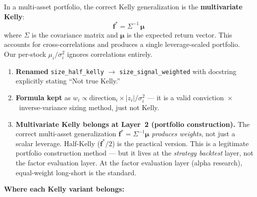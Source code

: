\documentclass[a4paper, 11pt]{report}
\theoremstyle{definition}
\theoremstyle{remark}
\begin{document}
\begin{description}[style=nextline, leftmargin=1.8cm]
        \medskip
        In a multi-asset portfolio, the correct Kelly generalization
        is the \textbf{multivariate Kelly}:
        \[
            \mathbf{f}^* = \Sigma^{-1}\,\boldsymbol{\mu}
        \]
        where $\Sigma$ is the covariance matrix and $\boldsymbol{\mu}$
        is the expected return vector.  This accounts for
        cross-correlations and produces a single leverage-scaled
        portfolio.  Our per-stock $\mu_i / \sigma_i^2$ ignores
        correlations entirely.

    \item[Resolution]
        \begin{enumerate}[nosep]
            \item \textbf{Renamed} \texttt{size\_half\_kelly} $\to$
                  \texttt{size\_signal\_weighted} with docstring
                  explicitly stating ``Not true Kelly.''
            \item \textbf{Formula kept} as
                  $w_i \propto \mathrm{direction}_i \times |z_i| / \sigma_i^2$
                  --- it is a valid conviction~$\times$~inverse-variance
                  sizing method, just not Kelly.
            \item \textbf{Multivariate Kelly belongs at Layer~2
                  (portfolio construction).}
                  The correct multi-asset generalization
                  $\mathbf{f}^* = \Sigma^{-1}\boldsymbol{\mu}$
                  \emph{produces weights}, not just a scalar leverage.
                  Half-Kelly ($\mathbf{f}^*/2$) is the practical
                  version.  This is a legitimate portfolio
                  construction method --- but it lives at the
                  \emph{strategy backtest} layer, not the factor
                  evaluation layer.  At the factor evaluation layer
                  (alpha research), equal-weight long-short is the
                  standard.
        \end{enumerate}

        \medskip\noindent
        \textbf{Where each Kelly variant belongs:}
        \begin{center}
        \small
        \end{center}


\end{description}
\end{document}
